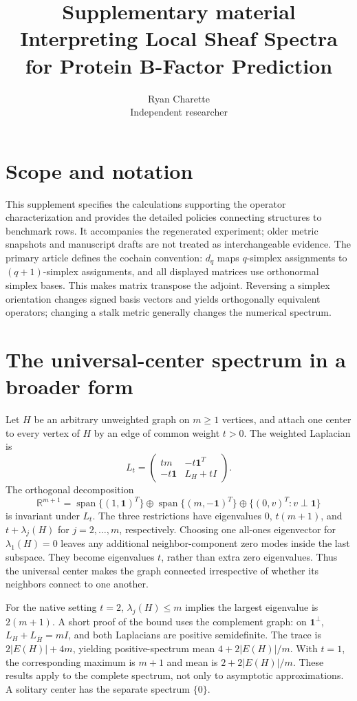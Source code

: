 \documentclass[10pt]{article}
\title{Supplementary material\\\large Interpreting Local Sheaf Spectra for Protein B-Factor Prediction}
\author{Ryan Charette\\\small Independent researcher}
\date{}
\newcommand{\R}{\mathbb{R}}
\begin{document}
\maketitle

\section{Scope and notation}
This supplement specifies the calculations supporting the operator characterization and provides the detailed policies connecting structures to benchmark rows. It accompanies the regenerated experiment; older metric snapshots and manuscript drafts are not treated as interchangeable evidence. The primary article defines the cochain convention: $d_q$ maps $q$-simplex assignments to $(q+1)$-simplex assignments, and all displayed matrices use orthonormal simplex bases. This makes matrix transpose the adjoint. Reversing a simplex orientation changes signed basis vectors and yields orthogonally equivalent operators; changing a stalk metric generally changes the numerical spectrum.

\section{The universal-center spectrum in a broader form}
Let $H$ be an arbitrary unweighted graph on $m\geq1$ vertices, and attach one center to every vertex of $H$ by an edge of common weight $t>0$. The weighted Laplacian is
\begin{equation}
L_t=\begin{pmatrix}tm&-t\mathbf1^T\\-t\mathbf1&L_H+tI\end{pmatrix}.
\end{equation}
The orthogonal decomposition
\begin{equation}
\R^{m+1}=\operatorname{span}\{(1,\mathbf1)^T\}
\oplus\operatorname{span}\{(m,-\mathbf1)^T\}
\oplus\{(0,v)^T:v\perp\mathbf1\}
\end{equation}
is invariant under $L_t$. The three restrictions have eigenvalues $0$, $t(m+1)$, and $t+\lambda_j(H)$ for $j=2,\ldots,m$, respectively. Choosing one all-ones eigenvector for $\lambda_1(H)=0$ leaves any additional neighbor-component zero modes inside the last subspace. They become eigenvalues $t$, rather than extra zero eigenvalues. Thus the universal center makes the graph connected irrespective of whether its neighbors connect to one another.

For the native setting $t=2$, $\lambda_j(H)\leq m$ implies the largest eigenvalue is $2(m+1)$. A short proof of the bound uses the complement graph: on $\mathbf1^\perp$, $L_H+L_{\overline H}=mI$, and both Laplacians are positive semidefinite. The trace is $2|E(H)|+4m$, yielding positive-spectrum mean $4+2|E(H)|/m$. With $t=1$, the corresponding maximum is $m+1$ and mean is $2+2|E(H)|/m$. These results apply to the complete spectrum, not only to asymptotic approximations. A solitary center has the separate spectrum $\{0\}$.
\end{document}
